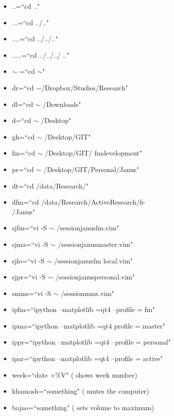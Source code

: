 \documentclass[twoside,a4paper]{article}
\newcommand{\tcb}{\color{blue}}
\newcommand{\tcr}{\color{red}}
\newcommand{\tcg}{\color{gray}}
\newcommand{\tck}{\color{black}}
\begin{document}
	\begin{itemize}
		\item \tcr ..\tck =\tcb ``cd .."
		\item \tcr ...\tck =\tcb ``cd ../.."
		\item \tcr ....\tck =\tcb ``cd ../../.."
		\item \tcr .....\tck =\tcb ``cd ../../../
		.."
		\item \tcr $\sim$ \tck =\tcb ``cd $\sim$"
		\item \tcr dr\tck =\tcb ``cd 
		$\sim$/Dropbox/Studies/Research"
		\item \tcr dl\tck =\tcb ``cd $\sim$
		/Downloads"
		\item \tcr d\tck =\tcb ``cd $\sim$
		/Desktop"
		\item \tcr gh\tck =\tcb ``cd $\sim$
		/Desktop/GIT"
		\item \tcr fm\tck =\tcb ``cd $\sim$
		/Desktop/GIT/
		fm\textunderscore development"
		\item \tcr pr\tck =\tcb ``cd $\sim$
		/Desktop/GIT/Personal/Janus"
		\item \tcr dt\tck =\tcb ``cd 
		/data/Research/"
		\item \tcr dfm\tck =\tcb ``cd 
		/data/Research/Active\textunderscore Research/fc \\
		/Janus"
		\item \tcr sjfm\tck =\tcb ``vi -S $\sim$
		/session\textunderscore janus\textunderscore fm.vim"
		\item \tcr sjma\tck =\tcb ``vi -S $\sim$
		/session\textunderscore janus\textunderscore master.vim"
		\item \tcr sjlo\tck =\tcb ``vi -S $\sim$
		/session\textunderscore janus\textunderscore fm\textunderscore
		local.vim"
		\item \tcr sjpr\tck =\tcb ``vi -S $\sim$
		/session\textunderscore janus\textunderscore personal.vim"
		\item \tcr smms\tck =\tcb ``vi -S $\sim$
		/session\textunderscore mms.vim"
		\item \tcr ipfm\tck =\tcb ``ipython 
		--matplotlib =qt4 --profile = fm"
		\item \tcr ipma\tck =\tcb ``ipython 
		--matplotlib =qt4 profile = master"
		\item \tcr ippr\tck =\tcb ``ipython 
		--matplotlib =qt4 --profile = personal"
		\item \tcr ipar\tck =\tcb ``ipython 
		--matplotlib =qt4 --profile = active"
		\item \tcr week\tck =\tcb ``date +$\%$V" 
		\tcg  ( shows week number)
		\item \tcr khamosh\tck =\tcb ``something" 
		\tcg  ( mutes the computer)
		\item \tcr bajao\tck =\tcb ``something" 
		\tcg  ( sets volume to maximum)
	\end{itemize}
\vfill \eject
\end{document}
